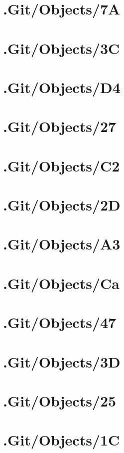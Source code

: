 \section*{.Git/Objects/7A}

\section*{.Git/Objects/3C}

\section*{.Git/Objects/D4}

\section*{.Git/Objects/27}

\section*{.Git/Objects/C2}

\section*{.Git/Objects/2D}

\section*{.Git/Objects/A3}

\section*{.Git/Objects/Ca}

\section*{.Git/Objects/47}

\section*{.Git/Objects/3D}

\section*{.Git/Objects/25}

\section*{.Git/Objects/1C}

